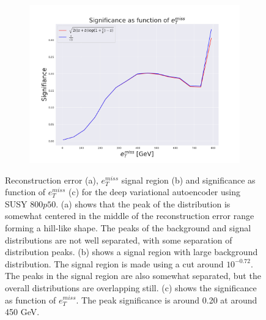 \begin{figure}[!htb]
    \begin{subfigure}{.49\textwidth}
        \includegraphics[width=\textwidth]{Figures/VAE_testing/big/2lep/significance_etmiss_800p0p050_-0.7232197345309495.pdf}
        \caption{}
        \label{fig:VAE_2lep_big_signi_800}
    \end{subfigure}
    \hfill      
    \caption[2lep deep network | $800p50$ | VAE]{Reconstruction error (a), $e_T^{miss}$ signal region (b) and significance as function of 
    $e_T^{miss}$ (c) for the deep variational autoencoder using SUSY $800p50$.
    (a) shows that the peak of the distribution is somewhat centered in the middle 
    of the reconstruction error range forming a hill-like shape. The peaks of the background and signal 
    distributions are not well separated, with some separation of distribution peaks. (b) 
    shows a signal region with large background distribution. The signal region is made using a cut around
    $10^{-0.72}$. The peaks in the signal region are also somewhat 
    separated, but the overall distributions are overlapping still. 
    (c) shows the significance as function of $e_T^{miss}$.
The peak significance is around 0.20 at around 450 GeV.}
    \label{fig:VAE_2lep_big_rec_sig_signi_800}
\end{figure}

